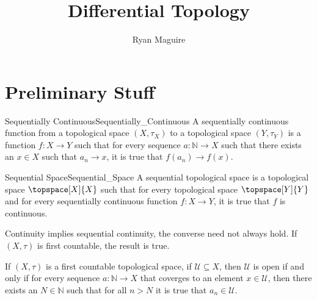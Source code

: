 \documentclass{article}                                                        %
\begin{document}
    \title{Differential Topology}
    \author{Ryan Maguire}
    \date{\vspace{-5ex}}
    \maketitle
    \section{Preliminary Stuff}
        \begin{fdefinition}{Sequentially Continuous}{Sequentially_Continuous}
            A sequentially continuous function from a topological space
            $(X,\tau_{X})$ to a topological space $(Y,\tau_{Y})$ is a
            function $f:X\rightarrow{Y}$ such that for every sequence
            $a:\mathbb{N}\rightarrow{X}$ such that there exists an $x\in{X}$
            such that $a_{n}\rightarrow{x}$, it is true that
            $f(a_{n})\rightarrow{f}(x)$.
        \end{fdefinition}
        \begin{fdefinition}{Sequential Space}{Sequential_Space}
            A sequential topological space is a topological space
            $\topspace[X]{X}$ such that for every topological space
            $\topspace[Y]{Y}$ and for every sequentially continuous function
            $f:X\rightarrow{Y}$, it is true that $f$ is continuous.
        \end{fdefinition}
        Continuity implies sequential continuity, the converse need not always
        hold. If $(X,\tau)$ is first countable, the result is true.
        \begin{theorem}
            \label{thm:First_Countable_Implies_Seq_Open_are_Open}%
            If $(X,\tau)$ is a first countable topological space, if
            $\mathcal{U}\subseteq{X}$, then $\mathcal{U}$ is open if and only if
            for every sequence $a:\mathbb{N}\rightarrow{X}$ that coverges to an
            element $x\in\mathcal{U}$, then there exists an $N\in\mathbb{N}$
            such that for all $n>N$ it is true that $a_{n}\in\mathcal{U}$.
        \end{theorem}
\end{document}
